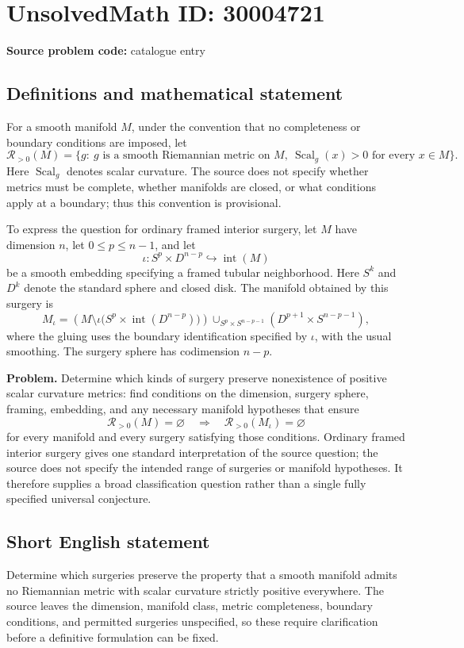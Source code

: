 \documentclass[11pt]{article}
\begin{document}
\section*{UnsolvedMath ID: 30004721}
\textbf{Source problem code:} catalogue entry
\subsection{Definitions and mathematical statement}
For a smooth manifold \(M\), under the convention that no completeness or boundary conditions are imposed, let
\[
\mathcal R_{>0}(M)=\{g:\ g\text{ is a smooth Riemannian metric on }M,\ \operatorname{Scal}_g(x)>0\text{ for every }x\in M\}.
\]
Here \(\operatorname{Scal}_g\) denotes scalar curvature. The source does not specify whether metrics must be complete, whether manifolds are closed, or what conditions apply at a boundary; thus this convention is provisional.

To express the question for ordinary framed interior surgery, let \(M\) have dimension \(n\), let \(0\leq p\leq n-1\), and let
\[
\iota:S^p\times D^{n-p}\hookrightarrow\operatorname{int}(M)
\]
be a smooth embedding specifying a framed tubular neighborhood. Here \(S^k\) and \(D^k\) denote the standard sphere and closed disk. The manifold obtained by this surgery is
\[
M_\iota=
\left(M\setminus\iota\bigl(S^p\times\operatorname{int}(D^{n-p})\bigr)\right)
\mathop{\cup}_{S^p\times S^{n-p-1}}
\left(D^{p+1}\times S^{n-p-1}\right),
\]
where the gluing uses the boundary identification specified by \(\iota\), with the usual smoothing. The surgery sphere has codimension \(n-p\).

\textbf{Problem.} Determine which kinds of surgery preserve nonexistence of positive scalar curvature metrics: find conditions on the dimension, surgery sphere, framing, embedding, and any necessary manifold hypotheses that ensure
\[
\mathcal R_{>0}(M)=\varnothing
\quad\Longrightarrow\quad
\mathcal R_{>0}(M_\iota)=\varnothing
\]
for every manifold and every surgery satisfying those conditions. Ordinary framed interior surgery gives one standard interpretation of the source question; the source does not specify the intended range of surgeries or manifold hypotheses. It therefore supplies a broad classification question rather than a single fully specified universal conjecture.
\subsection{Short English statement}
Determine which surgeries preserve the property that a smooth manifold admits no Riemannian metric with scalar curvature strictly positive everywhere. The source leaves the dimension, manifold class, metric completeness, boundary conditions, and permitted surgeries unspecified, so these require clarification before a definitive formulation can be fixed.
\end{document}
